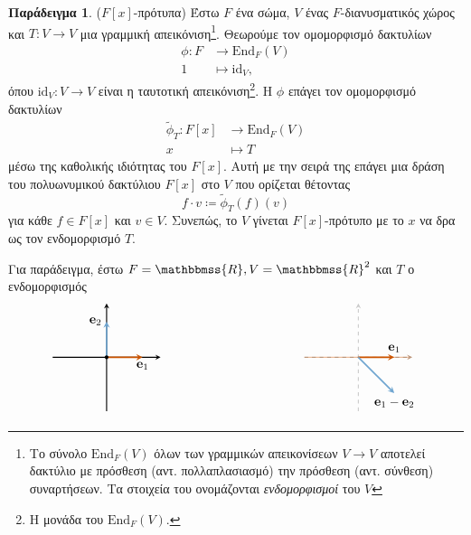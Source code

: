 \documentclass[12pt,a4paper,reqno]{amsart}
\theoremstyle{definition}
\newtheorem{example}[theorem]{Παράδειγμα}
\theoremstyle{remark}
\numberwithin{theorem}{section}
\numberwithin{exercise}{section}
\numberwithin{equation}{section}
\newcommand{\RR}{\mathbbmss{R}}
\newcommand{\bfe}{\mathbf{e}}
\renewcommand{\to}{\rightarrow}
\newcommand{\tl}{\tilde}
\newcommand{\End}{\mathrm{End}}
\newcommand{\rmid}{\mathrm{id}}
\begin{document}
\begin{example}{\rm($F[x]$-πρότυπα)}
    \label{ex:invariant_subspaces}
    Έστω $F$ ένα σώμα, $V$ ένας $F$-διανυσματικός χώρος και $T : V \to V$ μια γραμμική απεικόνιση\footnote{Το σύνολο $\End_F(V)$ όλων των γραμμικών απεικονίσεων $V \to V$ αποτελεί δακτύλιο με πρόσθεση (αντ. πολλαπλασιασμό) την πρόσθεση (αντ. σύνθεση) συναρτήσεων. Τα στοιχεία του ονομάζονται \emph{ενδομορφισμοί} του $V$}. Θεωρούμε τον ομομορφισμό δακτυλίων 
    \begin{align*}
        \phi : F &\to \End_F(V) \\ 
               1 &\mapsto \rmid_V,
    \end{align*}
    όπου $\rmid_V : V \to V$ είναι η ταυτοτική απεικόνιση\footnote{Η μονάδα του $\End_F(V)$.}. Η $\phi$ επάγει τον ομομορφισμό δακτυλίων 
    \begin{align*}
        \tilde{\phi}_T : F[x] &\to \End_F(V) \\ 
                            x &\mapsto T
    \end{align*}
    μέσω της καθολικής ιδιότητας του $F[x]$. Αυτή με την σειρά της επάγει μια δράση του πολυωνυμικού δακτύλιου $F[x]$ στο $V$ που ορίζεται θέτοντας 
    \[
    f\cdot{v} \coloneqq \tl{\phi}_T(f)(v)
    \]
    για κάθε $f \in F[x]$ και $v \in V$. Συνεπώς, το $V$ γίνεται $F[x]$-πρότυπο με το $x$ να δρα ως τον ενδομορφισμό $T$.

    Για παράδειγμα, έστω $F = \RR, V = \RR^2$ και $T$ ο ενδομορφισμός
   \[
\begin{tikzpicture}[>=stealth, thick, scale=1]
    \begin{scope}[shift={(-1,0)}]
        \draw[->] (-1.5,0) -- (1.5,0);
        \draw[->] (0,-1.5) -- (0,1.5);

        \draw[->, burntorange, very thick] (0,0) -- (1,0) node[below] {\textcolor{black}{$\bfe_1$}};
        \draw[->, iceberg, very thick] (0,0) -- (0,1) node[left] {\textcolor{black}{$\bfe_2$}};

        \fill (0,0) circle (1.5pt);
    \end{scope}
    \begin{scope}[shift={(6,0)}]
        \draw[->,burntorange!40] (-1.5,0) -- (1.5,0);
        \draw[->,dashed,opacity=.2] (0,-1.5) -- (0,1.5);
        \draw[->,dashed,opacity=.2] (-1.5,0) -- (1.5,0);

        \draw[->, burntorange, very thick] (0,0) -- (1,0) node[above] {\textcolor{black}{$\bfe_1$}};
        \draw[->, iceberg, very thick] (0,0) -- (1,-1) node[below] {\textcolor{black}{$\bfe_1 - \bfe_2$}};


\end{scope}
\end{tikzpicture}\]
\end{example}
\end{document}
